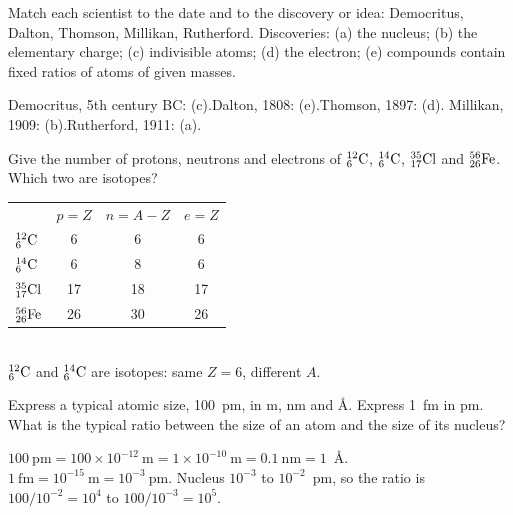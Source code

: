 
Match each scientist to the date and to the discovery or idea: Democritus, Dalton, Thomson, Millikan,
Rutherford. Discoveries: (a) the nucleus; (b) the elementary charge; (c) indivisible atoms;
(d) the electron; (e) compounds contain fixed ratios of atoms of given masses.
\begin{solution}
Democritus, 5th century BC: (c).\quad Dalton, 1808: (e).\quad Thomson, 1897: (d).\quad
Millikan, 1909: (b).\quad Rutherford, 1911: (a).
\end{solution}

Give the number of protons, neutrons and electrons of ${}^{12}_{6}\mathrm{C}$, ${}^{14}_{6}\mathrm{C}$,
${}^{35}_{17}\mathrm{Cl}$ and ${}^{56}_{26}\mathrm{Fe}$. Which two are isotopes?
\begin{solution}
\begin{tabular}{@{}lccc@{}}
 & $p = Z$ & $n = A - Z$ & $e = Z$\\
${}^{12}_{6}\mathrm{C}$ & 6 & 6 & 6\\
${}^{14}_{6}\mathrm{C}$ & 6 & 8 & 6\\
${}^{35}_{17}\mathrm{Cl}$ & 17 & 18 & 17\\
${}^{56}_{26}\mathrm{Fe}$ & 26 & 30 & 26
\end{tabular}\\
${}^{12}_{6}\mathrm{C}$ and ${}^{14}_{6}\mathrm{C}$ are isotopes: same $Z = 6$, different $A$.
\end{solution}

Express a typical atomic size, 100~pm, in m, nm and \AA. Express 1~fm in pm. What is the typical
ratio between the size of an atom and the size of its nucleus?
\begin{solution}
$100\ \mathrm{pm} = 100\times10^{-12}\ \mathrm m = 1\times10^{-10}\ \mathrm m = 0.1\ \mathrm{nm} = 1$~\AA.\quad
$1\ \mathrm{fm} = 10^{-15}\ \mathrm m = 10^{-3}\ \mathrm{pm}$.\quad
Nucleus $10^{-3}$ to $10^{-2}$~pm, so the ratio is $100/10^{-2} = 10^4$ to $100/10^{-3} = 10^5$.
\end{solution}

